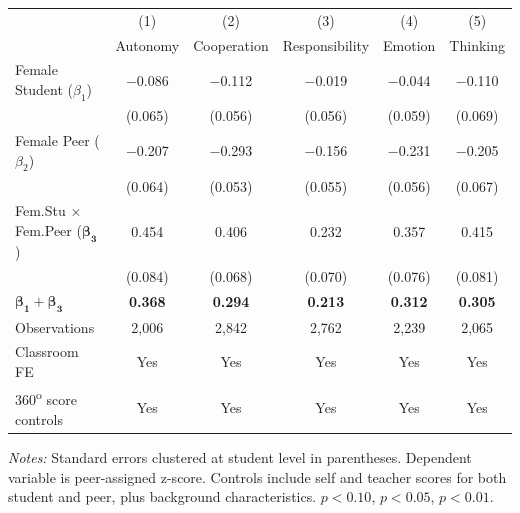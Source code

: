 \begin{threeparttable}
\begin{tabular}{l*{5}{c}}
\toprule
 & (1) & (2) & (3) & (4) & (5) \\
 & Autonomy & Cooperation & Responsibility & Emotion & Thinking \\
\midrule
{Female Student ($\beta_1$)} & $-$0.086 & $-$0.112\sym{**} & $-$0.019 & $-$0.044 & $-$0.110 \\
 & (0.065) & (0.056) & (0.056) & (0.059) & (0.069) \\[2pt]
{Female Peer ($\beta_2$)} & $-$0.207\sym{***} & $-$0.293\sym{***} & $-$0.156\sym{***} & $-$0.231\sym{***} & $-$0.205\sym{***} \\
 & (0.064) & (0.053) & (0.055) & (0.056) & (0.067) \\[2pt]
{Fem.Stu $\times$ Fem.Peer ($\bm{\beta_3}$)} & 0.454\sym{***} & 0.406\sym{***} & 0.232\sym{***} & 0.357\sym{***} & 0.415\sym{***} \\
 & (0.084) & (0.068) & (0.070) & (0.076) & (0.081) \\
\midrule
\rowcolor{HopBlue!8}
{$\bm{\beta_1 + \beta_3}$} & \textbf{0.368}\sym{***} & \textbf{0.294}\sym{***} & \textbf{0.213}\sym{***} & \textbf{0.312}\sym{***} & \textbf{0.305}\sym{***} \\
\midrule
Observations & 2,006 & 2,842 & 2,762 & 2,239 & 2,065 \\
Classroom FE & Yes & Yes & Yes & Yes & Yes \\
{360\textsuperscript{o} score controls} & Yes & Yes & Yes & Yes & Yes \\
\bottomrule
\end{tabular}
\begin{tablenotes}[flushleft]
\scriptsize
\item \textit{Notes:} Standard errors clustered at student level in parentheses. Dependent variable is peer-assigned z-score. Controls include self and teacher scores for both student and peer, plus background characteristics. \sym{*}$p<0.10$, \sym{**}$p<0.05$, \sym{***}$p<0.01$.
\end{tablenotes}
\end{threeparttable}
